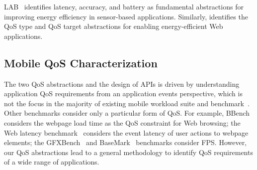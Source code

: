 LAB~\cite{lab} identifies latency, accuracy, and battery as fundamental abstractions for improving energy efficiency in sensor-based applications. Similarly, \greenweb identifies the QoS type and QoS target abstractions for enabling energy-efficient Web applications.

\subsection{Mobile QoS Characterization}
\label{sec:lang:related:qos}

The two QoS abstractions and the design of \greenweb APIs is driven by understanding application QoS requirements from an application events perspective, which is not the focus in the majority of existing mobile workload suite and benchmark~\cite{jsbench,BrowsingBench,BrowserMark,MobileBench,Moby,Vellamo,AnTuTu,sunspider,Octane,Kraken,GeekBench}. Other benchmarks consider only a particular form of QoS. For example, BBench~\cite{BBench} considers the webpage load time as the QoS constraint for Web browsing; the Web latency benchmark~\cite{WebLatencyBenchmark} considers the event latency of user actions to webpage elements; the GFXBench~\cite{GFXBench} and BaseMark~\cite{BaseMark} benchmarks consider FPS. However, our QoS abstractions lead to a general methodology to identify QoS requirements of a wide range of applications.

